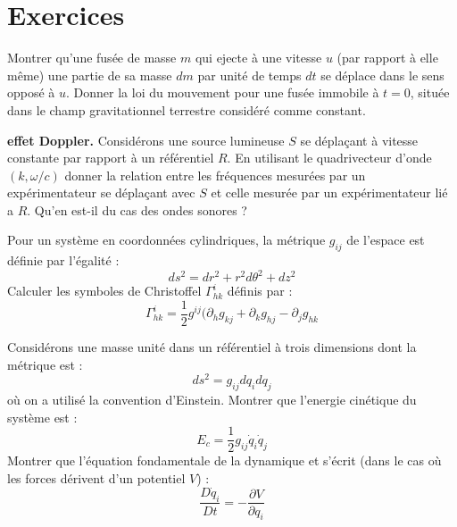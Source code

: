 \documentclass[12pt]{book}
\begin{document}
\section{Exercices}
\begin{exo}
Montrer qu'une fus\'ee de masse $m$ qui ejecte \`a une vitesse $u$ (par
rapport \`a elle m\^eme) une partie
de sa masse $dm$ par unit\'e de temps $dt$ se d\'eplace dans le sens oppos\'e
\`a $u$. Donner la loi du mouvement pour une fus\'ee immobile \`a $t=0$,
situ\'ee dans le champ gravitationnel terrestre consid\'er\'e comme constant. 
\end{exo}

\begin{exo}
{\bf effet Doppler.} Consid\'erons une source lumineuse $S$ se d\'epla\c cant
\`a vitesse constante par rapport \`a un r\'ef\'erentiel $R$.
En utilisant le quadrivecteur d'onde $(k,\omega/c)$ donner la relation entre
les fr\'equences mesur\'ees par un exp\'erimentateur se d\'epla\c cant avec
$S$ et celle mesur\'ee par un exp\'erimentateur li\'e a $R$.
Qu'en est-il du cas des ondes sonores ? 
\end{exo}

\begin{exo}
Pour un syst\`eme en coordonn\'ees cylindriques, la m\'etrique $g_{ij}$ de
l'espace est d\'efinie par l'\'egalit\'e
:
\begin{equation}
ds^2=dr^2+r^2d\theta^2+dz^2
\end{equation}
Calculer les symboles de Christoffel $\Gamma^{i}_{hk}$ d\'efinis par :
\begin{equation}
\Gamma^{i}_{hk}=\frac{1}{2}g^{ij} (\partial_hg_{kj}+ \partial_kg_{hj}-
\partial_jg_{hk}
\end{equation}
\end{exo}
\begin{exo}
Consid\'erons une masse unit\'e dans un r\'ef\'erentiel \`a trois dimensions
dont la m\'etrique est : 
\begin{equation}
ds^2=g_{ij}dq_idq_j
\end{equation}
o\`u on a utilis\'e la convention d'Einstein. Montrer que l'energie cin\'etique
du syst\`eme est : 
\begin{equation}
E_c=\frac{1}{2}g_{ij}\dot q_i\dot q_j
\end{equation}
Montrer que l'\'equation fondamentale de la dynamique et s'\'ecrit (dans le
cas o\`u les forces d\'erivent d'un potentiel $V$) :
\begin{equation}
\frac{D\dot q_i}{Dt}=-\frac{\partial V}{\partial q_i}
\end{equation}
\end{exo}
\end{document}
